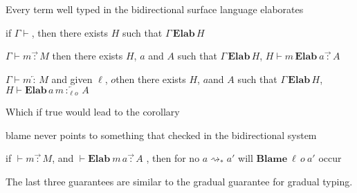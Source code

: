 \begin{conjecture}
Every term well typed in the bidirectional surface language elaborates 

if $\Gamma\vdash$, then there exists $H$ such that $\Gamma\,\textbf{Elab}\,H$ 

$\Gamma\vdash m\overrightarrow{\,:\,}M$ then there exists $H$, $a$
and $A$ such that $\Gamma\,\textbf{Elab}\,H$, $H\vdash m\,\textbf{Elab}\ a\overrightarrow{\,:\,}A$ 

$\Gamma\vdash m\overleftarrow{\,:\,}M$ and given $\ell$, $o$then
there exists $H$, $a$and $A$ such that $\Gamma\,\textbf{Elab}\,H$,
$H\vdash\textbf{Elab}\,a\,m\overleftarrow{\,:_{\ell o}\,}A$ 
\end{conjecture}

Which if true would lead to the corollary
\begin{conjecture}
blame never points to something that checked in the bidirectional
system 

if $\vdash m\overrightarrow{\,:\,}M$, and $\vdash\textbf{Elab}\ m\,a\overrightarrow{\,:\,}A$
, then for no $a\rightsquigarrow_{*}a'$ will $\textbf{Blame}\:\ensuremath{\ell}\,o\:a'$
occur 

\end{conjecture}

The last three guarantees are similar to the gradual guarantee \cite{siek_et_al:LIPIcs:2015:5031}
for gradual typing. 